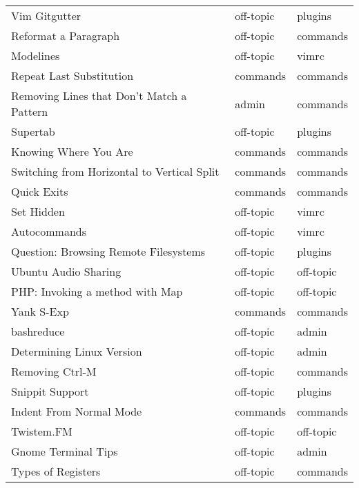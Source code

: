 \begin{tabular}{lll}
 Vim Gitgutter                               & off-topic   & plugins   \\
 Reformat a Paragraph                        & off-topic   & commands  \\
 Modelines                                   & off-topic   & vimrc     \\
 Repeat Last Substitution                    & commands    & commands  \\
 Removing Lines that Don't Match a Pattern   & admin       & commands  \\
 Supertab                                    & off-topic   & plugins   \\
 Knowing Where You Are                       & commands    & commands  \\
 Switching from Horizontal to Vertical Split & commands    & commands  \\
 Quick Exits                                 & commands    & commands  \\
 Set  Hidden                                 & off-topic   & vimrc     \\
 Autocommands                                & off-topic   & vimrc     \\
 Question: Browsing Remote Filesystems       & off-topic   & plugins   \\
 Ubuntu Audio Sharing                        & off-topic   & off-topic \\
 PHP: Invoking a method with Map             & off-topic   & off-topic \\
 Yank S-Exp                                  & commands    & commands  \\
 bashreduce                                  & off-topic   & admin     \\
 Determining Linux Version                   & off-topic   & admin     \\
 Removing Ctrl-M                             & off-topic   & commands  \\
 Snippit Support                             & off-topic   & plugins   \\
 Indent From Normal Mode                     & commands    & commands  \\
 Twistem.FM                                  & off-topic   & off-topic \\
 Gnome Terminal Tips                         & off-topic   & admin     \\
 Types of Registers                          & off-topic   & commands  \\

\end{tabular}
